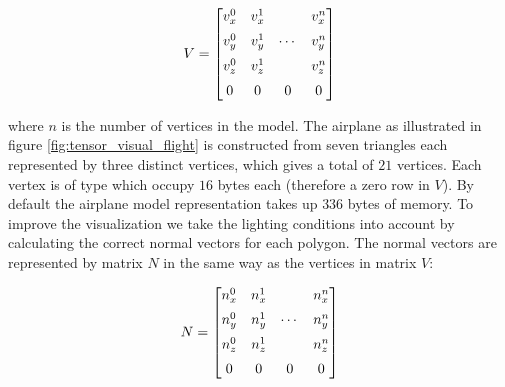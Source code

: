 \begin{equation}
\label{eq:model_vertex_buffer}
V =
\begin{bmatrix} 
  v^0_x & v^1_x &        & v^n_x \vspace{2mm} \\
  v^0_y & v^1_y & \dotsb & v^n_y \vspace{2mm} \\
  v^0_z & v^1_z &        & v^n_z \vspace{2mm} \\
    0   &   0  &    0   &   0
\end{bmatrix} 
\end{equation} 

where $n$ is the number of vertices in the model. The airplane as
illustrated in figure \vref{fig:tensor_visual_flight} is constructed
from seven triangles each represented by three distinct vertices,
which gives a total of $21$ vertices. Each vertex is of type
 which occupy $16$ bytes each (therefore a zero row in
$V$). By default the
airplane model representation takes up $336$ bytes of memory.
To improve the visualization we take the lighting conditions into
account by calculating the correct normal vectors for each polygon.
The normal vectors are represented by matrix $N$ in the same way as
the vertices in matrix $V$:

\begin{equation}
\label{eq:model_normal_buffer}
N =
\begin{bmatrix} 
  n^0_x & n^1_x &        & n^n_x \vspace{2mm} \\
  n^0_y & n^1_y & \dotsb & n^n_y \vspace{2mm} \\
  n^0_z & n^1_z &        & n^n_z \vspace{2mm} \\
    0   &   0  &    0   &   0 
\end{bmatrix} 
\end{equation} 

